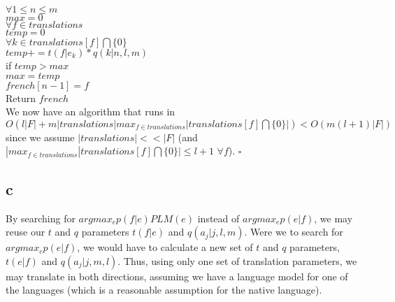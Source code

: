 \documentclass[twoside]{homework}
\begin{document}
$\forall 1 \leq n \leq m$ \\
\indent $max = 0$ \\
\indent $\forall f \in translations$ \\
\indent \indent $temp = 0$ \\
\indent \indent $\forall k \in translations[f] \bigcap \{0\}$ \\
\indent \indent \indent $temp += t(f|e_k) * q(k|n,l,m)$ \\
\indent \indent if $temp > max$ \\
\indent \indent \indent $max = temp$ \\
\indent \indent \indent $french[n-1] = f$ \\
Return $french$ \\
We now have an algorithm that runs in $O(l|F| + m|translations|max_{f \in translations}|translations[f] \bigcap \{0\}|) < O(m(l+1)|F|)$ since we assume $|translations| << |F|$ (and $|max_{f \in translations}|translations[f] \bigcap \{0\}| \leq l + 1$ $\forall f$).
$\square$
\subsection*{c}
By searching for $argmax_e p(f|e)PLM(e)$ instead of $argmax_e p(e|f)$, we may reuse our $t$ and $q$ parameters $t(f|e)$ and $q(a_j|j,l,m)$.  Were we to search for $argmax_e p(e|f)$, we would have to calculate a new set of $t$ and $q$ parameters, $t(e|f)$ and $q(a_j|j,m,l)$.  Thus, using only one set of translation parameters, we may translate in both directions, assuming we have a language model for one of the languages (which is a reasonable assumption for the native language).
\end{document}
